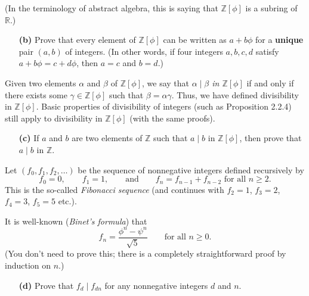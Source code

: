 \documentclass[paper=a4, fontsize=12pt]{scrartcl}%
\theoremstyle{plainsl}
\theoremstyle{definition}
\theoremstyle{remark}
\begin{document}
(In the terminology of abstract algebra, this is saying that $\mathbb{Z}%
\left[  \phi\right]  $ is a subring of $\mathbb{R}$.)

\begin{enumerate}
\item[\textbf{(b)}] Prove that every element of $\mathbb{Z}\left[
\phi\right]  $ can be written as $a + b \phi$ for a \textbf{unique} pair
$\left(  a, b \right)  $ of integers. (In other words, if four integers $a, b,
c, d$ satisfy $a + b \phi= c + d \phi$, then $a = c$ and $b = d$.)
\end{enumerate}

Given two elements $\alpha$ and $\beta$ of $\mathbb{Z}\left[  \phi\right]  $,
we say that \textit{$\alpha\mid\beta$ in $\mathbb{Z}\left[  \phi\right]  $} if
and only if there exists some $\gamma\in\mathbb{Z}\left[  \phi\right]  $ such
that $\beta= \alpha\gamma$. Thus, we have defined divisibility in
$\mathbb{Z}\left[  \phi\right]  $. Basic properties of divisibility of
integers (such as Proposition 2.2.4) still apply to divisibility in
$\mathbb{Z}\left[  \phi\right]  $ (with the same proofs).

\begin{enumerate}
\item[\textbf{(c)}] If $a$ and $b$ are two elements of $\mathbb{Z}$ such that
$a \mid b$ in $\mathbb{Z}\left[  \phi\right]  $, then prove that $a \mid b $
in $\mathbb{Z}$.
\end{enumerate}

Let $\left(  f_{0}, f_{1}, f_{2}, \ldots\right)  $ be the sequence of
nonnegative integers defined recursively by
\[
f_{0} = 0, \qquad f_{1} = 1, \qquad\text{and} \qquad f_{n} = f_{n-1} + f_{n-2}
\text{ for all } n \geq2 .
\]
This is the so-called \textit{Fibonacci sequence} (and continues with $f_{2} =
1$, $f_{3} = 2$, $f_{4} = 3$, $f_{5} = 5$ etc.).

It is well-known (\textit{Binet's formula}) that
\begin{equation}
f_{n}=\dfrac{\phi^{n}-\psi^{n}}{\sqrt{5}}\qquad\text{for all }n\geq
0.\label{exe.Zphi.basics.binet}%
\end{equation}
(You don't need to prove this; there is a completely straightforward proof by
induction on $n$.)

\begin{enumerate}
\item[\textbf{(d)}] Prove that $f_{d} \mid f_{dn}$ for any nonnegative
integers $d$ and $n$.
\end{enumerate}
\end{document}
